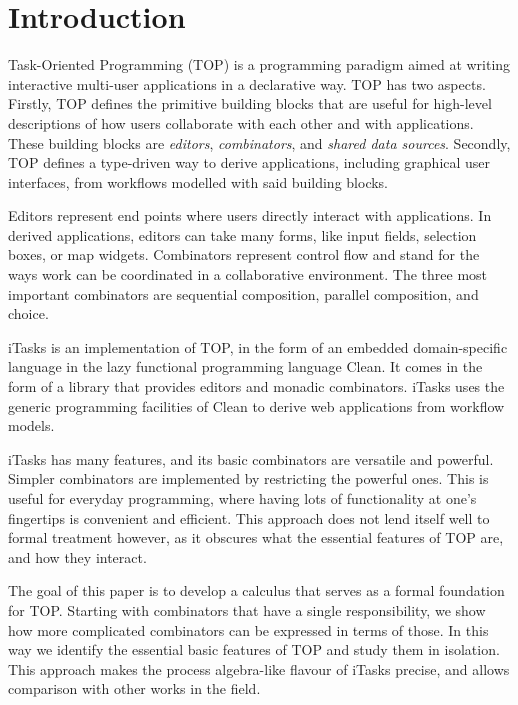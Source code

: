 
\section{Introduction}

Task-Oriented Programming (TOP) is a programming paradigm aimed at writing interactive multi-user applications in a declarative way.
TOP has two aspects.
Firstly, TOP defines the primitive building blocks that are useful for high-level descriptions of how users collaborate with each other and with applications.
These building blocks are \emph{editors}, \emph{combinators}, and \emph{shared data sources}.
Secondly, TOP defines a type-driven way to derive applications, including graphical user interfaces, from workflows modelled with said building blocks.

Editors represent end points where users directly interact with applications.
In derived applications, editors can take many forms, like input fields, selection boxes, or map widgets.
Combinators represent control flow and stand for the ways work can be coordinated in a collaborative environment.
The three most important combinators are sequential composition, parallel composition, and choice.

iTasks is an implementation of TOP, in the form of an embedded domain-specific language in the lazy functional programming language Clean.
It comes in the form of a library that provides editors and monadic combinators.
iTasks uses the generic programming facilities of Clean to derive web applications from workflow models.

iTasks has many features, and its basic combinators are versatile and powerful.
Simpler combinators are implemented by restricting the powerful ones.
This is useful for everyday programming, where having lots of functionality at one's fingertips is convenient and efficient.
This approach does not lend itself well to formal treatment however, as it obscures what the essential features of TOP are, and how they interact.

The goal of this paper is to develop a calculus that serves as a formal foundation for TOP.
Starting with combinators that have a single responsibility, we show how more complicated combinators can be expressed in terms of those.
In this way we identify the essential basic features of TOP and study them in isolation.
This approach makes the process algebra-like flavour of iTasks precise, and allows comparison with other works in the field.
